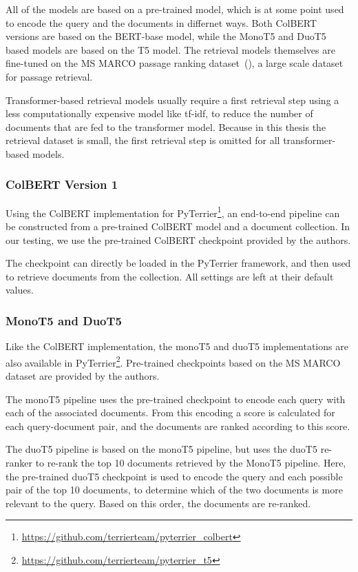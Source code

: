All of the models are based on a pre-trained model, which is at some point used to encode the query and the documents in differnet ways.
Both ColBERT versions are based on the BERT-base model, while the MonoT5 and DuoT5 based models are based on the T5 model.
The retrieval models themselves are fine-tuned on the MS MARCO passage ranking dataset~(\cite{bajaj:2016:MSMARCO}), a large scale dataset for passage retrieval.

Transformer-based retrieval models usually require a first retrieval step using a less computationally expensive model like tf-idf, to reduce the number of documents that are fed to the transformer model.
Because in this thesis the retrieval dataset is small, the first retrieval step is omitted for all transformer-based models.

\subsubsection{ColBERT Version 1}
Using the ColBERT implementation for PyTerrier\footnote{\url{https://github.com/terrierteam/pyterrier_colbert}}, an end-to-end pipeline can be constructed from a pre-trained ColBERT model and a document collection.
In our testing, we use the pre-trained ColBERT checkpoint provided by the authors.

The checkpoint can directly be loaded in the PyTerrier framework, and then used to retrieve documents from the collection.
All settings are left at their default values.

\subsubsection{MonoT5 and DuoT5}
Like the ColBERT implementation, the monoT5 and duoT5 implementations are also available in PyTerrier\footnote{\url{https://github.com/terrierteam/pyterrier_t5}}.
Pre-trained checkpoints based on the MS MARCO dataset are provided by the authors.

The monoT5 pipeline uses the pre-trained checkpoint to encode each query with each of the associated documents.
From this encoding a score is calculated for each query-document pair, and the documents are ranked according to this score.

The duoT5 pipeline is based on the monoT5 pipeline, but uses the duoT5 re-ranker to re-rank the top 10 documents retrieved by the MonoT5 pipeline.
Here, the pre-trained duoT5 checkpoint is used to encode the query and each possible pair of the top 10 documents, to determine which of the two documents is more relevant to the query.
Based on this order, the documents are re-ranked.

